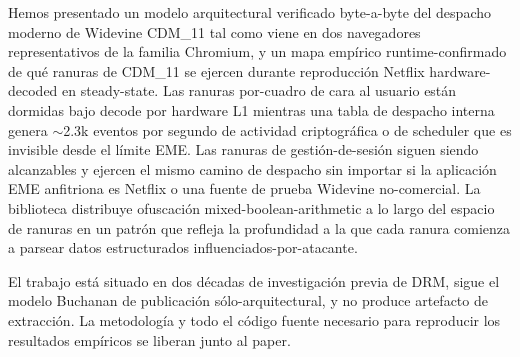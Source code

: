 \documentclass[11pt,letterpaper]{article}
\begin{document}
Hemos presentado un modelo arquitectural verificado byte-a-byte
del despacho moderno de Widevine CDM\_11 tal como viene en dos
navegadores representativos de la familia Chromium, y un mapa
empírico runtime-confirmado de qué ranuras de CDM\_11 se
ejercen durante reproducción Netflix hardware-decoded en
steady-state. Las ranuras por-cuadro de cara al usuario están
dormidas bajo decode por hardware L1 mientras una tabla de
despacho interna genera $\sim$2.3k eventos por segundo de
actividad criptográfica o de scheduler que es invisible desde
el límite EME. Las ranuras de gestión-de-sesión siguen siendo
alcanzables y ejercen el mismo camino de despacho sin importar
si la aplicación EME anfitriona es Netflix o una fuente de
prueba Widevine no-comercial. La biblioteca distribuye
ofuscación mixed-boolean-arithmetic a lo largo del espacio de
ranuras en un patrón que refleja la profundidad a la que cada
ranura comienza a parsear datos estructurados
influenciados-por-atacante.

El trabajo está situado en dos décadas de investigación previa
de DRM, sigue el modelo Buchanan de publicación
sólo-arquitectural, y no produce artefacto de extracción. La
metodología y todo el código fuente necesario para reproducir
los resultados empíricos se liberan junto al paper.
\end{document}
